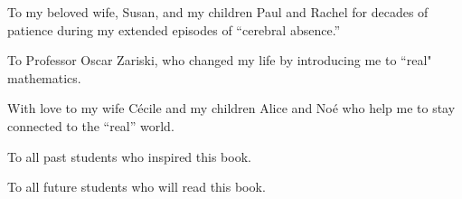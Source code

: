 \documentclass[envcountchap]{svmono}
\begin{document}
\bigskip


\begin{dedication}
To my beloved wife, Susan, and my children Paul and Rachel for decades of patience during my extended episodes of ``cerebral absence.''

\smallskip

\noindent
To Professor Oscar Zariski, who changed my life by introducing me to ``real" mathematics.

\bigskip

\noindent
With love to my wife C\'ecile and my children Alice and No\'e who help me to stay connected to the ``real'' world.
\smallskip

\noindent To all past students who inspired this book.

\noindent To all future students who will read this book.
\end{dedication}


\tableofcontents





\preface{
}


\mainmatter












\end{document}
